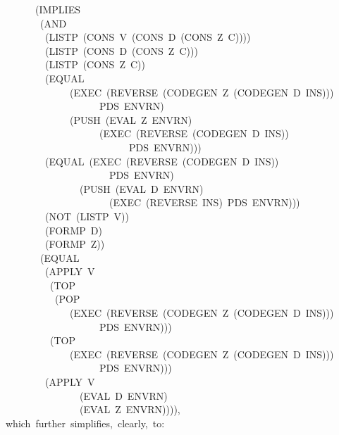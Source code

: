 \documentclass[11pt]{book}
\newenvironment{pubasis}{\begin{flushleft}\ttfamily\small}{\normalsize\rmfamily\end{flushleft}}
\begin{document}
\begin{pubasis}
~~~~~~~~~~(IMPLIES\\
~~~~~~~~~~~(AND\\
~~~~~~~~~~~~(LISTP~(CONS~V~(CONS~D~(CONS~Z~C))))\\
~~~~~~~~~~~~(LISTP~(CONS~D~(CONS~Z~C)))\\
~~~~~~~~~~~~(LISTP~(CONS~Z~C))\\
~~~~~~~~~~~~(EQUAL\\
~~~~~~~~~~~~~~~~~(EXEC~(REVERSE~(CODEGEN~Z~(CODEGEN~D~INS)))\\
~~~~~~~~~~~~~~~~~~~~~~~PDS~ENVRN)\\
~~~~~~~~~~~~~~~~~(PUSH~(EVAL~Z~ENVRN)\\
~~~~~~~~~~~~~~~~~~~~~~~(EXEC~(REVERSE~(CODEGEN~D~INS))\\
~~~~~~~~~~~~~~~~~~~~~~~~~~~~~PDS~ENVRN)))\\
~~~~~~~~~~~~(EQUAL~(EXEC~(REVERSE~(CODEGEN~D~INS))\\
~~~~~~~~~~~~~~~~~~~~~~~~~PDS~ENVRN)\\
~~~~~~~~~~~~~~~~~~~(PUSH~(EVAL~D~ENVRN)\\
~~~~~~~~~~~~~~~~~~~~~~~~~(EXEC~(REVERSE~INS)~PDS~ENVRN)))\\
~~~~~~~~~~~~(NOT~(LISTP~V))\\
~~~~~~~~~~~~(FORMP~D)\\
~~~~~~~~~~~~(FORMP~Z))\\
~~~~~~~~~~~(EQUAL\\
~~~~~~~~~~~~(APPLY~V\\
~~~~~~~~~~~~~(TOP\\
~~~~~~~~~~~~~~(POP\\
~~~~~~~~~~~~~~~~~(EXEC~(REVERSE~(CODEGEN~Z~(CODEGEN~D~INS)))\\
~~~~~~~~~~~~~~~~~~~~~~~PDS~ENVRN)))\\
~~~~~~~~~~~~~(TOP\\
~~~~~~~~~~~~~~~~~(EXEC~(REVERSE~(CODEGEN~Z~(CODEGEN~D~INS)))\\
~~~~~~~~~~~~~~~~~~~~~~~PDS~ENVRN)))\\
~~~~~~~~~~~~(APPLY~V\\
~~~~~~~~~~~~~~~~~~~(EVAL~D~ENVRN)\\
~~~~~~~~~~~~~~~~~~~(EVAL~Z~ENVRN)))),\\

~~~~which~further~simplifies,~clearly,~to:\\


\end{pubasis}
\end{document}
